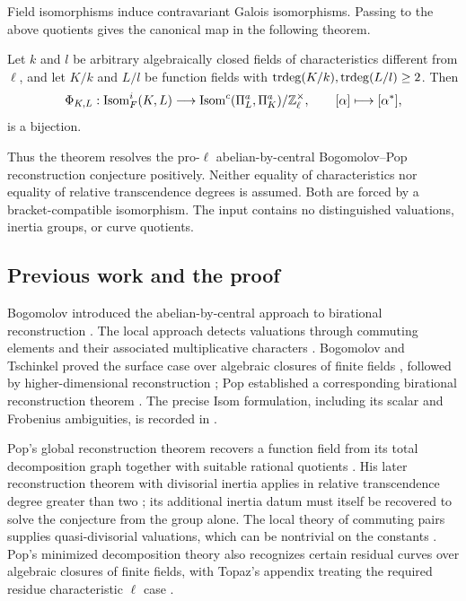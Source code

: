 Field isomorphisms induce contravariant Galois isomorphisms.  Passing to the
above quotients gives the canonical map in the following theorem.

\begin{theorem}\label{thm:main}
Let $k$ and $l$ be arbitrary algebraically closed fields of characteristics
different from $\ell$, and let $K/k$ and $L/l$ be function fields with
$\operatorname{trdeg}(K/k),\operatorname{trdeg}(L/l)\ge2$.  Then
\[
 \Phi_{K,L}:\operatorname{Isom}_F^i(K,L)\longrightarrow
 \operatorname{Isom}^c(\Pi_L^a,\Pi_K^a)/\mathbb Z_\ell^\times,
 \qquad [\alpha]\longmapsto[\alpha^*],
\]
is a bijection.
\end{theorem}

Thus the theorem resolves the pro-$\ell$ abelian-by-central
Bogomolov--Pop reconstruction conjecture positively.  Neither equality of
characteristics nor equality of relative transcendence degrees is assumed.
Both are forced by a bracket-compatible isomorphism.  The input contains
no distinguished valuations, inertia groups, or curve quotients.

\subsection{Previous work and the proof}
Bogomolov introduced the abelian-by-central approach to birational
reconstruction \cite{Bogomolov1991}.  The local approach detects
valuations through commuting elements and their associated multiplicative
characters \cite{BT2002,TopazCL2017}.
Bogomolov and Tschinkel proved the surface case over algebraic closures
of finite fields \cite{BT2008}, followed by higher-dimensional
reconstruction \cite{BT2011}; Pop established a corresponding
birational reconstruction theorem \cite{PopBI2012}.
The precise Isom formulation, including its scalar and Frobenius
ambiguities, is recorded in
\cite[Introduction, Conjecture~1]{TopazRat2016}.

Pop's global reconstruction
theorem recovers a function field from its total decomposition graph
together with suitable rational quotients
\cite{PopGraphs2012,PopBI2012}.  His later reconstruction theorem with
divisorial inertia applies in relative transcendence degree greater than
two \cite[Theorem~1.1]{Pop2018}; its additional inertia datum must itself
be recovered to solve the conjecture from the group alone.
The local theory of commuting pairs supplies quasi-divisorial valuations,
which can be nontrivial on the constants
\cite{Pop2018,Topaz2019}.  Pop's minimized decomposition theory also
recognizes certain residual curves over algebraic closures of finite
fields, with Topaz's appendix treating the required residue
characteristic $\ell$ case \cite{PopMin2015}.

